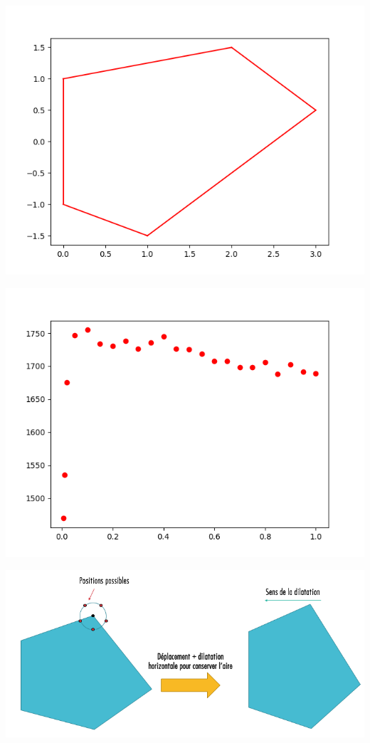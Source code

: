 \documentclass[a4paper,reqno]{article}
\begin{document}
\begin{center}
\includegraphics[scale=0.5]{initialPolygon.png}
\end{center}

\begin{center}
\includegraphics[scale=0.5]{plotPas.png}
\end{center}

\begin{center}
\includegraphics[scale=0.5]{alternatif.png}
\end{center}
\end{document}
